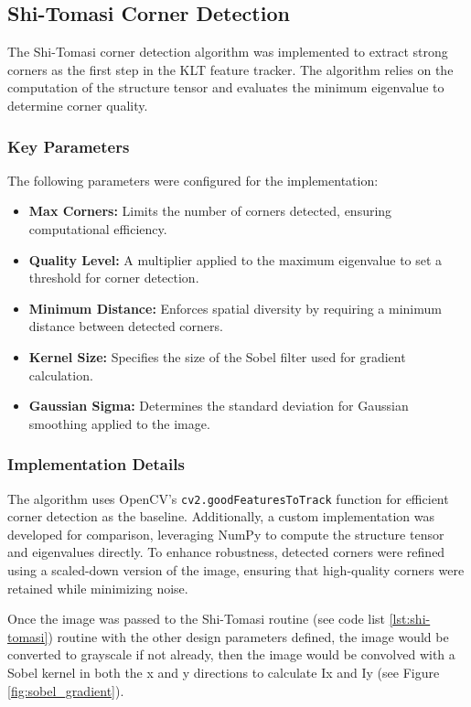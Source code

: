 \documentclass[11pt, conference, letterpaper]{IEEEtran}
\begin{document}
\subsection{Shi-Tomasi Corner Detection}
The Shi-Tomasi corner detection algorithm was implemented to extract strong corners as the first step in the KLT feature tracker. The algorithm relies on the computation of the structure tensor and evaluates the minimum eigenvalue to determine corner quality.

\subsubsection{Key Parameters}
The following parameters were configured for the implementation:
\begin{itemize}
    \item \textbf{Max Corners:} Limits the number of corners detected, ensuring computational efficiency.
    \item \textbf{Quality Level:} A multiplier applied to the maximum eigenvalue to set a threshold for corner detection.
    \item \textbf{Minimum Distance:} Enforces spatial diversity by requiring a minimum distance between detected corners.
    \item \textbf{Kernel Size:} Specifies the size of the Sobel filter used for gradient calculation.
    \item \textbf{Gaussian Sigma:} Determines the standard deviation for Gaussian smoothing applied to the image.
\end{itemize}
\bigskip

\subsubsection{Implementation Details}
The algorithm uses OpenCV's \texttt{cv2.goodFeaturesToTrack} function for efficient corner detection as the baseline. Additionally, a custom implementation was developed for comparison, leveraging NumPy to compute the structure tensor and eigenvalues directly.
To enhance robustness, detected corners were refined using a scaled-down version of the image, ensuring that high-quality corners were retained while minimizing noise. 

Once the image was passed to the Shi-Tomasi routine (see code list \ref{lst:shi-tomasi}) routine with the other design parameters defined, the image would be converted to grayscale if not already, then the image would be convolved with a Sobel kernel in both the x and y directions to calculate Ix and Iy (see Figure \ref{fig:sobel_gradient}). 
\end{document}
